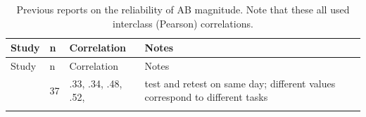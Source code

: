 \documentclass[11pt,english,]{memoir}
\begin{document}
\begin{longtable}[]{@{}llll@{}}
\caption{\label{tab:AB-reliability} Previous reports on the reliability of AB magnitude. Note that these all used interclass (Pearson) correlations.}\tabularnewline
\toprule
\begin{minipage}[b]{0.19\columnwidth}\raggedright
Study\strut
\end{minipage} & \begin{minipage}[b]{0.03\columnwidth}\raggedright
n\strut
\end{minipage} & \begin{minipage}[b]{0.15\columnwidth}\raggedright
Correlation\strut
\end{minipage} & \begin{minipage}[b]{0.51\columnwidth}\raggedright
Notes\strut
\end{minipage}\tabularnewline
\midrule
\endfirsthead
\toprule
\begin{minipage}[b]{0.19\columnwidth}\raggedright
Study\strut
\end{minipage} & \begin{minipage}[b]{0.03\columnwidth}\raggedright
n\strut
\end{minipage} & \begin{minipage}[b]{0.15\columnwidth}\raggedright
Correlation\strut
\end{minipage} & \begin{minipage}[b]{0.51\columnwidth}\raggedright
Notes\strut
\end{minipage}\tabularnewline
\midrule
\endhead
\begin{minipage}[t]{0.19\columnwidth}\raggedright
\textcite{Kelly2011}\strut
\end{minipage} & \begin{minipage}[t]{0.03\columnwidth}\raggedright
37\strut
\end{minipage} & \begin{minipage}[t]{0.15\columnwidth}\raggedright
.33, .34, .48, .52,\strut
\end{minipage} & \begin{minipage}[t]{0.51\columnwidth}\raggedright
test and retest on same day; different values correspond to different tasks\strut
\end{minipage}\tabularnewline
\begin{minipage}[t]{0.19\columnwidth}\raggedright
\textcite{Dale2013a}\strut
\end{minipage} & \begin{minipage}[t]{0.03\columnwidth}\raggedright

\end{minipage}
\end{longtable}
\end{document}
